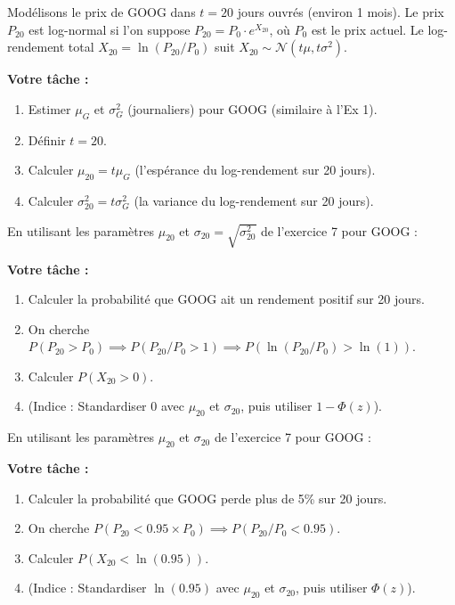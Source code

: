 \begin{exercicebox}
Modélisons le prix de GOOG dans $t=20$ jours ouvrés (environ 1 mois).
Le prix $P_{20}$ est log-normal si l'on suppose $P_{20} = P_0 \cdot e^{X_{20}}$, où $P_0$ est le prix actuel.
Le log-rendement total $X_{20} = \ln(P_{20}/P_0)$ suit $X_{20} \sim \mathcal{N}(t\mu, t\sigma^2)$.

\textbf{Votre tâche :}
\begin{enumerate}
    \item Estimer $\mu_G$ et $\sigma_G^2$ (journaliers) pour GOOG (similaire à l'Ex 1).
    \item Définir $t=20$.
    \item Calculer $\mu_{20} = t\mu_G$ (l'espérance du log-rendement sur 20 jours).
    \item Calculer $\sigma_{20}^2 = t\sigma_G^2$ (la variance du log-rendement sur 20 jours).
\end{enumerate}
\end{exercicebox}

\begin{exercicebox}
En utilisant les paramètres $\mu_{20}$ et $\sigma_{20} = \sqrt{\sigma_{20}^2}$ de l'exercice 7 pour GOOG :

\textbf{Votre tâche :}
\begin{enumerate}
    \item Calculer la probabilité que GOOG ait un rendement positif sur 20 jours.
    \item On cherche $P(P_{20} > P_0) \implies P(P_{20}/P_0 > 1) \implies P(\ln(P_{20}/P_0) > \ln(1))$.
    \item Calculer $P(X_{20} > 0)$.
    \item (Indice : Standardiser 0 avec $\mu_{20}$ et $\sigma_{20}$, puis utiliser $1 - \Phi(z)$).
\end{enumerate}
\end{exercicebox}

\begin{exercicebox}
En utilisant les paramètres $\mu_{20}$ et $\sigma_{20}$ de l'exercice 7 pour GOOG :

\textbf{Votre tâche :}
\begin{enumerate}
    \item Calculer la probabilité que GOOG perde plus de 5\% sur 20 jours.
    \item On cherche $P(P_{20} < 0.95 \times P_0) \implies P(P_{20}/P_0 < 0.95)$.
    \item Calculer $P(X_{20} < \ln(0.95))$.
    \item (Indice : Standardiser $\ln(0.95)$ avec $\mu_{20}$ et $\sigma_{20}$, puis utiliser $\Phi(z)$).
\end{enumerate}
\end{exercicebox}

